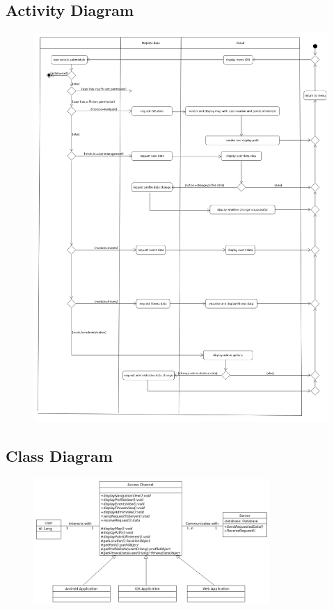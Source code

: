 \subsection{Activity Diagram}
\begin{figure}[!h]
	\includegraphics[width=\textwidth]{Access_Modules/AccessActivity.png}
\end{figure}

\subsection{Class Diagram}
\begin{figure}[!h]
	\includegraphics[width=0.8\textwidth]{Access_Modules/AccessClassDiagramV2.png}
\end{figure}
